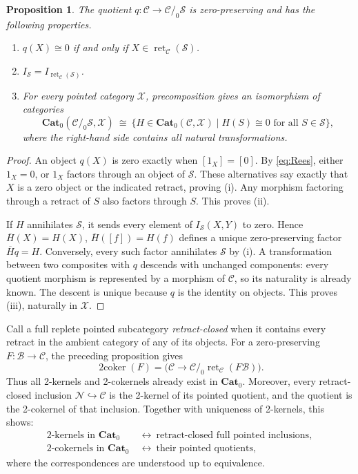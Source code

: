 \documentclass[11pt,reqno,a4paper]{amsart}
\newtheorem{proposition}[theorem]{Proposition}
\theoremstyle{definition}
\theoremstyle{remark}
\newcommand{\C}{\mathcal{C}}
\newcommand{\N}{\mathcal{N}}
\newcommand{\0}{\mathbf{0}}
\renewcommand{\1}{\mathbf{1}}
\newcommand{\iso}{\cong}
\newcommand{\Pt}{\mathbf{Cat}_{0}}
\newcommand{\B}{\mathcal B}
\newcommand{\Scl}{\mathcal S}
\newcommand{\X}{\mathcal X}
\newcommand{\twocoker}{\operatorname{2coker}}
\newcommand{\pq}[2]{#1/_{\!0}#2}
\DeclareMathOperator{\ret}{ret}
\begin{document}
\begin{proposition}\label{prop:pointedquotient}
The quotient $q:\C\to\pq{\C}{\Scl}$ is zero-preserving and has the
following properties.
\begin{enumerate}[label=\textup{(\roman*)}]
\item $q(X)\iso0$ if and only if $X\in\ret_{\C}(\Scl)$.
\item $I_{\Scl}=I_{\ret_{\C}(\Scl)}$.
\item For every pointed category $\X$, precomposition gives an
isomorphism of categories
\begin{equation}\label{eq:pointedquotientUP}
 \Pt(\pq{\C}{\Scl},\X)\ \iso\
 \{H\in\Pt(\C,\X)\mid H(S)\iso0\text{ for all }S\in\Scl\},
\end{equation}
where the right-hand side contains all natural transformations.
\end{enumerate}
\end{proposition}
\begin{proof}
An object $q(X)$ is zero exactly when $[1_X]=[0]$. By
\eqref{eq:Rees}, either $1_X=0$, or $1_X$ factors through an object
of $\Scl$. These alternatives say exactly that $X$ is a zero object
or the indicated retract, proving (i). Any morphism factoring through a
retract of $S$ also factors through $S$. This proves (ii).

If $H$ annihilates $\Scl$, it sends every element of
$I_{\Scl}(X,Y)$ to zero. Hence
$\overline H(X)=H(X)$, $\overline H([f])=H(f)$ defines a unique
zero-preserving factor $\overline Hq=H$. Conversely, every such factor
annihilates $\Scl$ by (i). A transformation between two composites
with $q$ descends with unchanged components: every quotient morphism
is represented by a morphism of $\C$, so its naturality is already
known. The descent is unique because $q$ is the identity on objects.
This proves (iii), naturally in $\X$.
\end{proof}

Call a full replete pointed subcategory \emph{retract-closed} when it
contains every retract in the ambient category of any of its objects.
For a zero-preserving $F:\B\to\C$, the preceding proposition gives
\begin{equation}\label{eq:pointedcoker}
 \twocoker(F)=
 \bigl(\C\longrightarrow\pq{\C}{\ret_{\C}(F\B)}\bigr).
\end{equation}
Thus all 2-kernels and 2-cokernels already exist in $\Pt$.
Moreover, every retract-closed inclusion $\N\hookrightarrow\C$ is
the 2-kernel of its pointed quotient, and the quotient is the 2-cokernel
of that inclusion. Together with uniqueness of 2-kernels, this shows:
\begin{equation}\label{eq:pointednormalforms}
 \begin{split}
 \text{2-kernels in }\Pt
 &\ \longleftrightarrow\ \text{retract-closed full pointed inclusions},\\
 \text{2-cokernels in }\Pt
 &\ \longleftrightarrow\ \text{their pointed quotients},
 \end{split}
\end{equation}
where the correspondences are understood up to equivalence.
\end{document}
